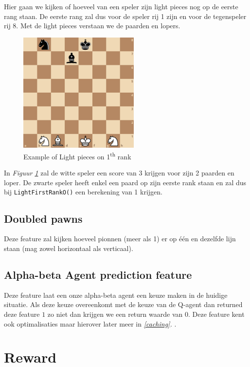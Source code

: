 \documentclass[a4paper,openany]{uantwerpenassignment}
\newcommand{\codeword}[1]{
    \colorbox{code}{\texttt{\textcolor{codetext}{#1}}}
}
\newcommand{\reference}[1]{\textit{\ref{#1}. \nameref{#1}}}
\newcommand{\figref}[1]{\textit{Figuur \ref{#1}}}
\newcommand{\ts}{\textsuperscript}
\begin{document}
Hier gaan we kijken of hoeveel van een speler zijn light pieces nog op de eerste rang staan. De eerste rang zal dus voor de speler rij 1 zijn en voor de tegenspeler rij 8. Met de light pieces verstaan we de paarden en lopers.

\begin{figure}[h]
    \centering
    \includegraphics[width=170pt]{images/LightFirstRank.png}
    \caption{Example of Light pieces on 1\ts{th} rank}
    \label{fig:light1rank}
\end{figure}

In \figref{fig:light1rank} zal de witte speler een score van 3 krijgen voor zijn 2 paarden en loper. De zwarte speler heeft enkel een paard op zijn eerste rank staan en zal dus bij \codeword{LightFirstRankO()} een berekening van 1 krijgen.



\subsection{Doubled pawns}

Deze feature zal kijken hoeveel pionnen (meer als 1) er op één en dezelfde lijn staan (mag zowel horizontaal als verticaal).


\subsection{Alpha-beta Agent prediction feature}

Deze feature laat een onze alpha-beta agent een keuze maken in de huidige situatie. Als deze keuze overeenkomt met de keuze van de Q-agent dan returned deze feature $1$ zo niet dan krijgen we een return waarde van $0$. Deze feature kent ook optimalisaties maar hierover later meer in \reference{caching}.




\section{Reward}
\end{document}
